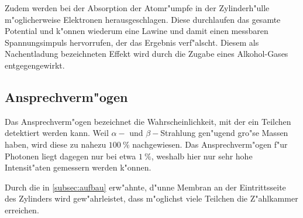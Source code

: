		Zudem werden bei der Absorption der Atomr"umpfe in der Zylinderh"ulle m"oglicherweise Elektronen herausgeschlagen.
		Diese durchlaufen das gesamte Potential und k"onnen wiederum eine Lawine und damit einen messbaren Spannungsimpuls hervorrufen, der das Ergebnis verf"alscht.
		Diesem als Nachentladung bezeichneten Effekt wird durch die Zugabe eines Alkohol-Gases entgegengewirkt.

	\subsection{Ansprechverm"ogen}
	\label{subsec:ansprechvermoegen}
		Das Ansprechverm"ogen bezeichnet die Wahrscheinlichkeit, mit der ein Teilchen detektiert werden kann.
		Weil $\alpha-$ und $\beta-$Strahlung gen"ugend gro"se Massen haben, wird diese zu nahezu $\SI{100}{\percent}$ nachgewiesen.
		Das Ansprechverm"ogen f"ur Photonen liegt dagegen nur bei etwa $\SI{1}{\percent}$, weshalb hier nur sehr hohe Intensit"aten gemessern werden k"onnen.

		Durch die in \ref{subsec:aufbau} erw"ahnte, d"unne Membran an der Eintrittsseite des Zylinders wird gew"ahrleistet, dass m"oglichst viele Teilchen die Z"ahlkammer erreichen.